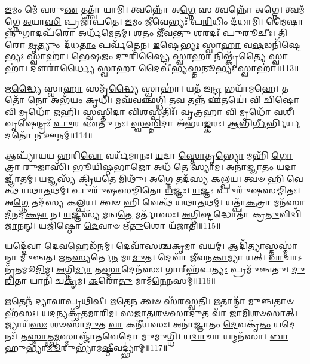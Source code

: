 \-\ul{𑌇}\-𑌮𑌂 𑌮𑍇᳴ 𑌵𑌰𑍁\-\ul{𑌣} 𑌤𑌤𑍍𑌤𑍍𑌵𑌾᳴ 𑌯𑌾𑌮𑌿।
𑌤𑍍𑌵𑌨𑍍𑌨𑍋᳴ 𑌅\-\ul{𑌗𑍍𑌨𑍇} 𑌸 𑌤𑍍𑌵𑌨𑍍𑌨𑍋᳴ 𑌅𑌗𑍍𑌨𑍇।
𑌤𑍍𑌵𑌮᳴𑌗𑍍𑌨𑍇 \ul{𑌅}\-𑌯𑌾\-\ul{𑌸𑌿} 𑌪𑍍𑌰𑌜𑌾᳴𑌪𑌤𑍇।
\-\ul{𑌇}\-𑌮𑌂 \ul{𑌜𑍀}\-𑌵𑍇𑌭𑍍𑌯𑌃᳴ 𑌪\-\ul{𑌰𑌿}\-𑌧𑌿𑌂 𑌦᳴𑌧𑌾𑌮𑌿।
𑌮𑍈𑌷𑌾𑌨𑍍𑌨𑍁᳴\-\ul{𑌗𑌾}\-𑌦𑌪᳴\-\ul{𑌰𑍋} 𑌅𑌰𑍍𑌧᳴\-\ul{𑌮𑍇}\-𑌤𑌮𑍍।
\-\ul{𑌶}\-𑌤𑌂 𑌜𑍀᳴𑌵𑌨𑍍𑌤𑍁 \ul{𑌶}\-𑌰𑌦𑌃᳴ 𑌪𑍁\-\ul{𑌰𑍂}\-𑌚𑍀𑌃।
\-\ul{𑌤𑌿}\-𑌰𑍋 \ul{𑌮𑍃}\-𑌤𑍍𑌯𑍁𑌂 𑌦᳴𑌧\-\ul{𑌤𑌾𑌂} 𑌪𑌰𑍍𑌵᳴𑌤𑍇𑌨।
\-\ul{𑌇}\-𑌷𑍍𑌟𑍇\-\ul{𑌭𑍍𑌯𑌃} 𑌸𑍍𑌵𑌾\-\ul{𑌹𑌾} 𑌵\-\ul{𑌷}\-𑌡𑌨𑌿᳴𑌷𑍍𑌟𑍇\-\ul{𑌭𑍍𑌯𑌃} 𑌸𑍍𑌵𑌾𑌹𑌾॑।
\-\ul{𑌭𑍇}\-\-\ul{𑌷}\-𑌜𑌂 𑌦𑍁𑌰𑌿᳴\-\ul{𑌷𑍍𑌟𑍍𑌯𑍈} 𑌸𑍍𑌵𑌾\-\ul{𑌹𑌾} 𑌨𑌿𑌷𑍍𑌕𑍃᳴\-\ul{𑌤𑍍𑌯𑍈} 𑌸𑍍𑌵𑌾𑌹𑌾॑।
𑌦𑍗𑌰𑌾॑\-\ul{𑌰𑍍𑌧𑍍𑌯𑍈} 𑌸𑍍𑌵𑌾\-\ul{𑌹𑌾} 𑌦𑍈𑌵𑍀॑𑌭𑍍𑌯\-\ul{𑌸𑍍𑌤}\-𑌨𑍂\-\ul{𑌭𑍍𑌯𑌃} 𑌸𑍍𑌵𑌾𑌹𑌾॑॥113॥

𑌋\-\ul{𑌦𑍍𑌧𑍍𑌯𑍈} 𑌸𑍍𑌵𑌾\-\ul{𑌹𑌾} 𑌸𑌮𑍃᳴\-\ul{𑌦𑍍𑌧𑍍𑌯𑍈} 𑌸𑍍𑌵𑌾𑌹𑌾॑।
𑌯𑌤᳴ 𑌇\-\ul{𑌨𑍍𑌦𑍍𑌰} 𑌭𑌯𑌾᳴𑌮𑌹𑍇।
𑌤𑌤𑍋᳴ \ul{𑌨𑍋} 𑌅𑌭᳴𑌯𑌂 𑌕𑍃𑌧𑌿।
𑌮𑌘᳴𑌵\-\ul{𑌞𑍍𑌛}\-𑌗𑍍𑌧𑌿 𑌤\-\ul{𑌵} 𑌤𑌨𑍍𑌨᳴ \ul{𑌊}\-𑌤𑌯𑍇॑।
𑌵𑌿 𑌦𑍍𑌵𑌿\-\ul{𑌷𑍋} 𑌵𑌿 𑌮𑍃𑌧𑍋᳴ 𑌜𑌹𑌿।
\-\ul{𑌸𑍍𑌵}\-\-\ul{𑌸𑍍𑌤𑌿}\-𑌦𑌾 \ul{𑌵𑌿}\-𑌶𑌸𑍍𑌪𑌤𑌿𑌃᳴।
\-\ul{𑌵𑍃}\-\-\ul{𑌤𑍍𑌰}\-𑌹𑌾 𑌵𑌿 𑌮𑍃𑌧𑍋᳴ \ul{𑌵}\-𑌶𑍀।
𑌵𑍃𑌷𑍇𑌨𑍍𑌦𑍍𑌰𑌃᳴ \ul{𑌪𑍁}\-𑌰 𑌏᳴𑌤𑍁 𑌨𑌃।
\-\ul{𑌸𑍍𑌵}\-\-\ul{𑌸𑍍𑌤𑌿}\-𑌦𑌾 𑌅᳴𑌭𑌯\-\ul{𑌙𑍍𑌕}\-𑌰𑌃।
\-\ul{𑌆}\-𑌭𑌿\-\ul{𑌰𑍍𑌗𑍀}\-𑌰𑍍𑌭𑌿𑌰𑍍𑌯𑌦𑌤𑍋᳴ 𑌨 \ul{𑌊}\-𑌨𑌮𑍍॥114॥

𑌆𑌪𑍍𑌯𑌾᳴𑌯𑌯 𑌹𑌰𑌿\-\ul{𑌵𑍋} 𑌵𑌰𑍍𑌧᳴𑌮𑌾𑌨𑌃।
\-\ul{𑌯}\-𑌦𑌾 \ul{𑌸𑍍𑌤𑍋}\-𑌤𑍃\-\ul{𑌭𑍍𑌯𑍋} 𑌮𑌹𑌿᳴ \ul{𑌗𑍋}\-𑌤𑍍𑌰𑌾 \ul{𑌰𑍁}\-𑌜𑌾𑌸𑌿᳴।
\-\ul{𑌭𑍂}\-\-\ul{𑌯𑌿}\-\-\ul{𑌷𑍍𑌠}\-𑌭𑌾\-\ul{𑌜𑍋} 𑌅𑌧᳴ 𑌤𑍇 𑌸𑍍𑌯𑌾𑌮।
𑌅𑌨𑌾॑𑌜𑍍𑌞𑌾\-\ul{𑌤𑌂} 𑌯𑌦𑌾𑌜𑍍𑌞𑌾᳴𑌤𑌮𑍍।
\-\ul{𑌯}\-𑌜𑍍𑌞𑌸𑍍𑌯᳴ \ul{𑌕𑍍𑌰𑌿}\-𑌯\-\ul{𑌤𑍇} 𑌮𑌿𑌥𑍁᳴।
𑌅\-\ul{𑌗𑍍𑌨𑍇} 𑌤𑌦᳴𑌸𑍍𑌯 𑌕𑌲𑍍𑌪𑌯।
𑌤𑍍𑌵𑍞 𑌹𑌿 𑌵𑍇𑌤𑍍𑌥᳴ 𑌯𑌥𑌾\-\ul{𑌤}\-𑌥𑌮𑍍।
𑌪𑍁𑌰𑍁᳴𑌷𑌸𑌮𑍍𑌮𑌿𑌤𑍋 \ul{𑌯}\-𑌜𑍍𑌞𑌃।
\-\ul{𑌯}\-𑌜𑍍𑌞𑌃 𑌪𑍁𑌰𑍁᳴𑌷𑌸𑌮𑍍𑌮𑌿𑌤𑌃।
𑌅\-\ul{𑌗𑍍𑌨𑍇} 𑌤𑌦᳴𑌸𑍍𑌯 𑌕𑌲𑍍𑌪𑌯।
𑌤𑍍𑌵𑍞 𑌹𑌿 𑌵𑍇𑌤𑍍𑌥᳴ 𑌯𑌥𑌾\-\ul{𑌤}\-𑌥𑌮𑍍।
𑌯𑌤𑍍𑌪𑌾᳴\-\ul{𑌕}\-𑌤𑍍𑌰𑌾 𑌮𑌨᳴𑌸𑌾 \ul{𑌦𑍀}\-𑌨𑌦᳴\-\ul{𑌕𑍍𑌷𑌾} 𑌨।
\-\ul{𑌯}\-𑌜𑍍𑌞𑌸𑍍𑌯᳴ \ul{𑌮}\-𑌨𑍍𑌵\-\ul{𑌤𑍇} 𑌮𑌰𑍍𑌤𑌾᳴𑌸𑌃।
\-\ul{𑌅}\-𑌗𑍍𑌨𑌿𑌷𑍍𑌟𑌦𑍍𑌧𑍋𑌤𑌾॑ 𑌕𑍍𑌰\-\ul{𑌤𑍁}\-𑌵𑌿𑌦𑍍𑌵𑌿᳴\-\ul{𑌜𑌾}\-𑌨𑌨𑍍।
𑌯𑌜𑌿᳴𑌷𑍍𑌠𑍋 \ul{𑌦𑍇}\-𑌵𑌾𑍞 𑌋᳴\-\ul{𑌤𑍁}\-𑌶𑍋 𑌯᳴𑌜𑌾𑌤𑌿॥115॥\anuvakamend[\-\ul{𑌦𑍇}\-𑌵𑌾𑍟\-\ul{𑌶𑍍𑌚𑌿}\-𑌤𑍍𑌰𑌂 \ul{𑌤}\-𑌨𑍂\-\ul{𑌭𑍍𑌯𑌃} 𑌸𑍍𑌵𑌾\-\ul{𑌹𑍋}\-𑌨𑌂 𑌪𑍁𑌰𑍁᳴𑌷𑌸\-\ul{𑌮𑍍𑌮𑌿}\-𑌤𑍋\-𑌽\-\ul{𑌗𑍍𑌨𑍇} 𑌤𑌦᳴𑌸𑍍𑌯 𑌕𑌲𑍍𑌪\-\ul{𑌯} 𑌪𑌞𑍍𑌚᳴ 𑌚]

𑌯𑌦𑍍𑌦𑍇᳴𑌵𑌾 𑌦𑍇\-\ul{𑌵}\-𑌹𑍇𑌡᳴𑌨𑌮𑍍।
𑌦𑍇𑌵𑌾᳴𑌸𑌶𑍍𑌚\-\ul{𑌕𑍃}\-𑌮𑌾 \ul{𑌵}\-𑌯𑌮𑍍।
𑌆𑌦𑌿᳴\-\ul{𑌤𑍍𑌯𑌾}\-\-𑌸𑍍𑌤𑌸𑍍𑌮𑌾॑𑌨𑍍𑌮𑌾 𑌮𑍁𑌞𑍍𑌚𑌤।
\-\ul{𑌋}\-𑌤\-\ul{𑌸𑍍𑌯}\-𑌰𑍍𑌤𑍇\-\ul{𑌨} 𑌮𑌾\-\ul{𑌮𑍁}\-𑌤।
𑌦𑍇𑌵𑌾᳴ 𑌜𑍀𑌵𑌨\-\ul{𑌕𑌾}\-𑌮𑍍𑌯𑌾 𑌯𑌤𑍍।
\-\ul{𑌵𑌾}\-𑌚𑌾\-𑌽𑌨𑍃᳴𑌤𑌮𑍂\-\ul{𑌦𑌿}\-𑌮।
\-\ul{𑌅}\-𑌗𑍍𑌨𑌿\-\ul{𑌰𑍍𑌮𑌾} 𑌤\-\ul{𑌸𑍍𑌮𑌾}\-𑌦𑍇𑌨᳴𑌸𑌃।
𑌗𑌾𑌰𑍍‌\mbox{}𑌹᳴𑌪\-\ul{𑌤𑍍𑌯𑌃} 𑌪𑍍𑌰𑌮𑍁᳴𑌞𑍍𑌚𑌤𑍁।
\-\ul{𑌦𑍁}\-\-\ul{𑌰𑌿}\-𑌤𑌾 𑌯𑌾𑌨𑌿᳴ 𑌚\-\ul{𑌕𑍃}\-𑌮।
\-\ul{𑌕}\-𑌰𑍋\-\ul{𑌤𑍁} 𑌮𑌾𑌮᳴\-\ul{𑌨𑍇}\-𑌨𑌸𑌮𑍍॑॥116॥

\-\ul{𑌋}\-𑌤𑍇𑌨᳴ 𑌦𑍍𑌯𑌾𑌵𑌾𑌪𑍃𑌥𑌿𑌵𑍀।
\-\ul{𑌋}\-𑌤𑍇\-\ul{𑌨} 𑌤𑍍𑌵𑍞 𑌸᳴𑌰𑌸𑍍𑌵𑌤𑌿।
\-\ul{𑌋}\-𑌤𑌾𑌨𑍍𑌮𑌾᳴ 𑌮𑍁\-\ul{𑌞𑍍𑌚}\-𑌤𑌾𑍞𑌹᳴𑌸𑌃।
𑌯\-\ul{𑌦}\-𑌨𑍍𑌯𑌕𑍃᳴𑌤𑌮𑌾\-\ul{𑌰𑌿}\-𑌮।
\-\ul{𑌸}\-\-\ul{𑌜𑌾}\-\-\ul{𑌤}\-\-\ul{𑌶}\-\-\ul{𑍞}\-𑌸𑌾\-\ul{𑌦𑍁}\-𑌤 𑌵𑌾᳴ 𑌜𑌾𑌮𑌿\-\ul{𑌶}\-\-\ul{𑍞}\-𑌸𑌾𑌤𑍍।
𑌜𑍍𑌯𑌾𑌯᳴\-\ul{𑌸𑌃} 𑌶𑍞𑌸𑌾᳴\-\ul{𑌦𑍁}\-𑌤 \ul{𑌵𑌾} 𑌕𑌨𑍀᳴𑌯𑌸𑌃।
𑌅𑌨𑌾॑𑌜𑍍𑌞𑌾𑌤𑌂 \ul{𑌦𑍇}\-𑌵𑌕𑍃᳴\-\ul{𑌤𑌂} 𑌯𑌦𑍇𑌨𑌃᳴।
𑌤\-\ul{𑌸𑍍𑌮𑌾}\-𑌤𑍍𑌤𑍍𑌵\-\ul{𑌮}\-𑌸𑍍𑌮𑌾𑌞𑍍𑌜𑌾᳴𑌤𑌵𑍇𑌦𑍋 𑌮𑍁𑌮𑍁𑌗𑍍𑌧𑌿।
𑌯\-\ul{𑌦𑍍𑌵𑌾}\-𑌚𑌾 𑌯𑌨𑍍𑌮𑌨᳴𑌸𑌾।
\-\ul{𑌬𑌾}\-𑌹𑍁𑌭𑍍𑌯𑌾᳴\-\ul{𑌮𑍂}\-𑌰𑍁𑌭𑍍𑌯𑌾᳴𑌮\-\ul{𑌷𑍍𑌠𑍀}\-𑌵𑌦𑍍𑌭𑍍𑌯𑌾॑𑌮𑍍॥117॥

